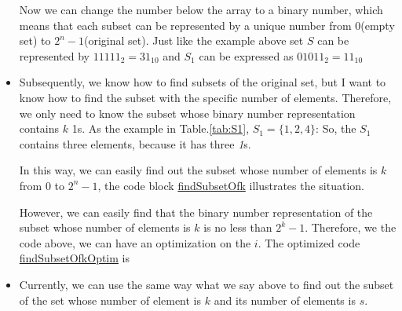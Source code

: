 \begin{itemize}
\begin{table}[!hpbt]
                \caption{}
                \label{tab:S1}
            \end{table}
            Now we can change the number below the array to a binary number, which means that each subset can be represented by a unique number from 
            0(empty set) to $2^n-1$(original set). Just like the example above set $S$ can be represented by $11111_2 = 31_{10}$ and $S_1$ can be expressed 
            as $01011_2 = 11_{10}$
            \item Subsequently, we know how to find subsets of the original set, but I want to know how to find the subset with the specific number of elements. 
            Therefore, we only need to know the subset whose binary number representation contains $k$ 1s. As the example in Table.\ref{tab:S1}, $S_1=\{1,2,4\}$:
            So, the $S_1$ contains three elements, because it has three \emph{1}s.

            In this way, we can easily find out the subset whose number of elements is $k$ from $0$ to $2^n-1$, the code block \hyperref[code:fS1]{findSubsetOfk} illustrates the situation.
            \lstset{xleftmargin=0.5em,xrightmargin=0.5em}
            \label{code:fS1}
            

            However, we can easily find that the binary number representation of the subset whose number of elements is $k$ is 
            no less than $2^k-1$. Therefore, we the code above, we can have an optimization on the $i$. The optimized code \hyperref[code:fS2]{findSubsetOfkOptim} is 

            \lstset{xleftmargin=0.5em,xrightmargin=0.5em}
            \label{code:fS2}
            
            
        \end{itemize}
        \begin{itemize}
            \item Currently, we can use the same way what we say above to find out the subset of the set whose number of element is 
            $k$ and its number of elements is $s$.
        \end{itemize}
